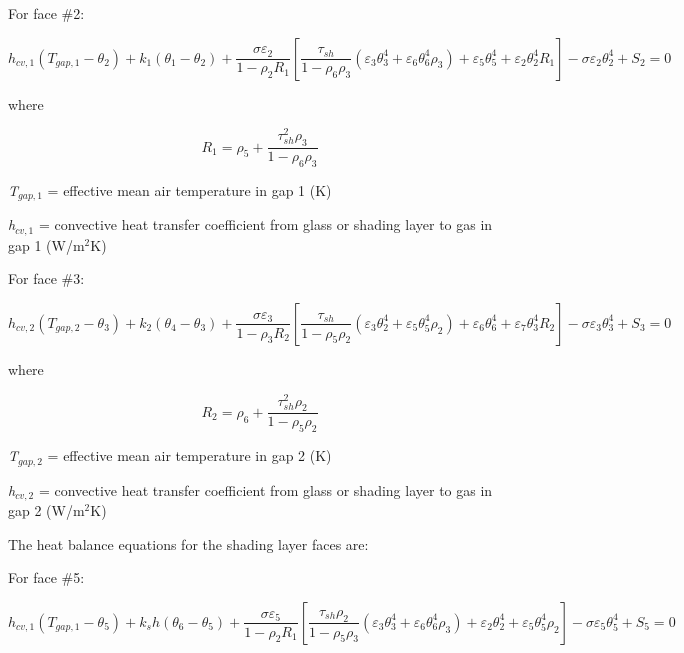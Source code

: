 For face \#2:

\begin{equation}
h_{cv,1} (T_{gap,1}-\theta_2) + k_1 (\theta_1-\theta_2) +
    \frac{\sigma \varepsilon_2}{1-\rho_2 R_1} \left[
      \frac{\tau_{sh}}{1-\rho_6\rho_3} (
        \varepsilon_3 \theta_3^4 + \varepsilon_6\theta_6^4\rho_3
      )
      + \varepsilon_5\theta_5^4 + \varepsilon_2\theta_2^4R_1
    \right]-{\sigma \varepsilon_2 \theta_2^4}+{S_2}=0
\end{equation}

where

\begin{equation}
{R_1} = {\rho_5} + \frac{{\tau_{sh}^2{\rho_3}}}{{1 - {\rho_6}{\rho_3}}}
\end{equation}

\emph{T\(_{gap,1}\)} = effective mean air temperature in gap 1 (K)

\emph{h\(_{cv,1}\)} = convective heat transfer coefficient from glass or shading layer to gas in gap 1 (W/m\(^{2}\)K)

For face \#3:

\begin{equation}
h_{cv,2} (T_{gap,2}-\theta_3) + k_2 (\theta_4-\theta_3) +
    \frac{\sigma \varepsilon_3}{1-\rho_3 R_2} \left[
      \frac{\tau_{sh}}{1-\rho_5\rho_2} (
        \varepsilon_3 \theta_2^4 + \varepsilon_5\theta_5^4\rho_2
      )
      + \varepsilon_6\theta_6^4 + \varepsilon_7\theta_3^4R_2
    \right]-{\sigma \varepsilon_3 \theta_3^4}+{S_3}=0
\end{equation}

where

\begin{equation}
{R_2} = {\rho_6} + \frac{{\tau_{sh}^2{\rho_2}}}{{1 - {\rho_5}{\rho_2}}}
\end{equation}

\emph{T\(_{gap,2}\)} = effective mean air temperature in gap 2 (K)

\emph{h\(_{cv,2}\)} = convective heat transfer coefficient from glass or shading layer to gas in gap 2 (W/m\(^{2}\)K)

The heat balance equations for the shading layer faces are:

For face \#5:

\begin{equation}
h_{cv,1} (T_{gap,1}-\theta_5) + k_sh (\theta_6-\theta_5) +
    \frac{\sigma \varepsilon_5}{1-\rho_2 R_1} \left[
      \frac{\tau_{sh}\rho_2}{1-\rho_5\rho_3} (
        \varepsilon_3 \theta_3^4 + \varepsilon_6\theta_6^4\rho_3
      )
      + \varepsilon_2\theta_2^4 + \varepsilon_5\theta_5^4\rho_2
    \right]-{\sigma \varepsilon_5 \theta_5^4}+{S_5}=0
\end{equation}

